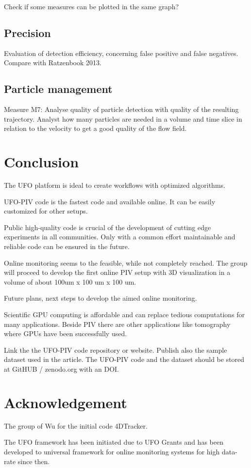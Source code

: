 \documentclass[11pt,draft]{amsart}
\begin{document}
Check if some measures can be plotted in the same graph? 


\subsection{Precision}

Evaluation of detection efficiency, concerning false positive and false negatives. Compare with 
Ratzenbook 2013.





\subsection{Particle management}

Measure M7: Analyse quality of particle detection with quality of the resulting trajectory.
Analyst how many particles are needed in a volume and time slice in relation to the velocity to get a good quality of the flow field.



\section{Conclusion}

The UFO platform is ideal to create workflows with optimized algorithms. 

UFO-PIV code is the fastest code and available online. It can be easily customized for other setups. 

Public high-quality code is crucial of the development of cutting edge experiments in all communities. Only with a common effort maintainable and reliable code can be ensured in the future. 

Online monitoring seems to the feasible, while not completely reached. The group will proceed to develop the first online PIV setup with 3D visualization in a volume of about 100um x 100 um x 100 um.

Future plans, next steps to develop the aimed online monitoring.
 
Scientific GPU computing is affordable and can replace tedious computations for many applications. Beside PIV there are other applications like tomography where GPUs have been successfully used.

Link the the UFO-PIV code repository or website. Publish also the sample dataset used in the article. The UFO-PIV code and the dataset should be stored at GitHUB / zenodo.org with an DOI.



\section{Acknowledgement}

The group of Wu for the initial code 4DTracker.

The UFO framework has been initiated due to UFO Grants and has been developed to universal framework for online monitoring systems for high data-rate since then.
\end{document}
